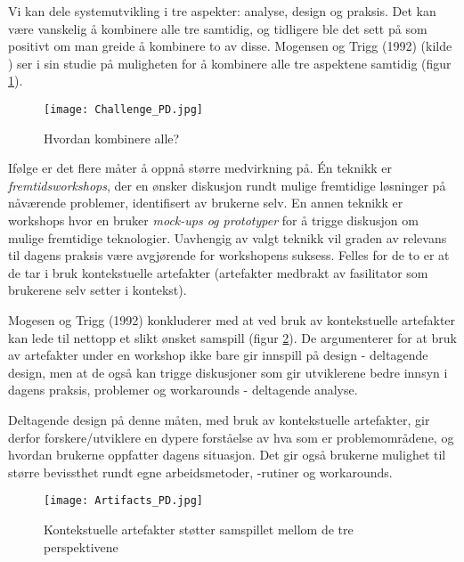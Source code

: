 \noindent
Vi kan dele systemutvikling i tre aspekter: analyse, design og praksis. Det kan være vanskelig å kombinere alle tre samtidig, og tidligere ble det sett på som positivt om man greide å kombinere to av disse. Mogensen og Trigg (1992) (kilde \cite{Mogensen92}) ser i sin studie på muligheten for å kombinere alle tre aspektene samtidig (figur \ref{Challenge_PD}).

\begin{figure}[H]
\centering
\texttt{[image: Challenge\_PD.jpg]}
\caption{Hvordan kombinere alle?}
\label{Challenge_PD}
\end{figure}

\noindent
Ifølge \cite{Mogensen92} er det flere måter å oppnå større medvirkning på. Én teknikk er \emph{fremtidsworkshops}, der en ønsker diskusjon rundt mulige fremtidige løsninger på nåværende problemer, identifisert av brukerne selv. En annen teknikk er workshops hvor en bruker \emph{mock-ups og prototyper} for å trigge diskusjon om mulige fremtidige teknologier. Uavhengig av valgt teknikk vil graden av relevans til dagens praksis være avgjørende for workshopens suksess. Felles for de to er at de tar i bruk kontekstuelle artefakter (artefakter medbrakt av fasilitator som brukerene selv setter i kontekst).

\noindent
Mogesen og Trigg (1992) konkluderer med at ved bruk av kontekstuelle artefakter kan lede til nettopp et slikt ønsket samspill (figur \ref{Artifacts_PD}). De argumenterer for at bruk av artefakter under en workshop ikke bare gir innspill på design - deltagende design, men at de også kan trigge diskusjoner som gir utviklerene bedre innsyn i dagens praksis, problemer og workarounds - deltagende analyse. 

\noindent
Deltagende design på denne måten, med bruk av kontekstuelle artefakter, gir derfor forskere/utviklere en dypere forståelse av hva som er problemområdene, og hvordan brukerne oppfatter dagens situasjon. Det gir også brukerne mulighet til større bevissthet rundt egne arbeidsmetoder, -rutiner og workarounds.

\begin{figure}[H]
\centering
\texttt{[image: Artifacts\_PD.jpg]}
\caption{Kontekstuelle artefakter støtter samspillet mellom de tre perspektivene}
\label{Artifacts_PD}
\end{figure}